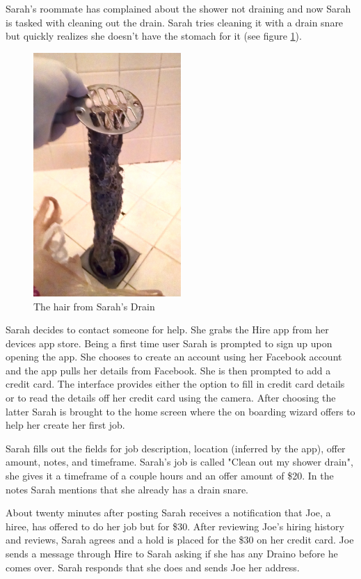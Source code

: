 \documentclass[11pt]{article}
\begin{document}
Sarah's roommate has complained about the shower not draining and now Sarah is tasked with cleaning out the drain. Sarah tries cleaning it with a drain snare but quickly realizes she doesn't have the stomach for it (see figure \ref{fig:sarahs-drain}).

\begin{figure}[htb]
    \centering
    \includegraphics[width=0.5\textwidth]{Img/showerhair}
    \caption{The hair from Sarah's Drain}\label{fig:sarahs-drain}
\end{figure} 

Sarah decides to contact someone for help. She grabs the Hire app from her devices app store. Being a first time user Sarah is prompted to sign up upon opening the app. She chooses to create an account using her Facebook account and the app pulls her details from Facebook. She is then prompted to add a credit card. The interface provides either the option to fill in credit card details or to read the details off her credit card using the camera. After choosing the latter Sarah is brought to the home screen where the on boarding wizard offers to help her create her first job. 

Sarah fills out the fields for job description, location (inferred by the app), offer amount, notes, and timeframe. Sarah's job is called "Clean out my shower drain", she gives it a timeframe of a couple hours and an offer amount of \$20. In the notes Sarah mentions that she already has a drain snare.

About twenty minutes after posting Sarah receives a notification that Joe, a hiree, has offered to do her job but for \$30. After reviewing Joe's hiring history and reviews, Sarah agrees and a hold is placed for the \$30 on her credit card. Joe sends a message through Hire to Sarah asking if she has any Draino before he comes over. Sarah responds that she does and sends Joe her address. 
\end{document}
